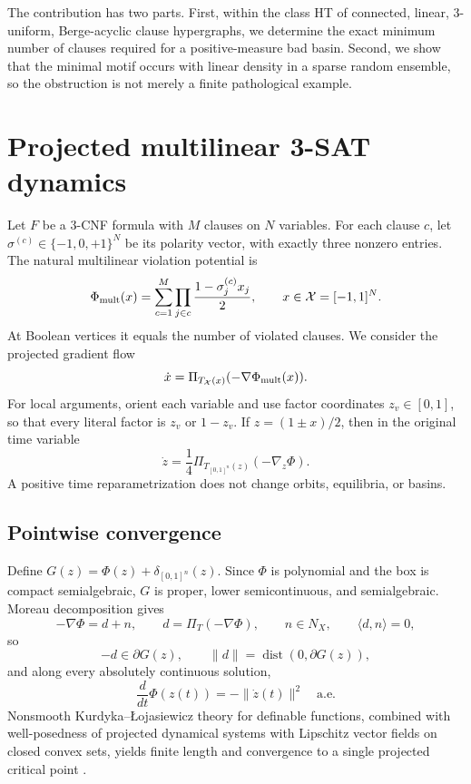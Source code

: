 \documentclass[11pt,a4paper]{article}
\newcommand{\X}{\mathcal X}
\begin{document}
The contribution has two parts. First, within the class HT of connected, linear, 3-uniform, Berge-acyclic clause hypergraphs, we determine the exact minimum number of clauses required for a positive-measure bad basin. Second, we show that the minimal motif occurs with linear density in a sparse random ensemble, so the obstruction is not merely a finite pathological example.

\section{Projected multilinear 3-SAT dynamics}
Let $F$ be a 3-CNF formula with $M$ clauses on $N$ variables. For each clause $c$, let $\sigma^{(c)}\in\{-1,0,+1\}^N$ be its polarity vector, with exactly three nonzero entries. The natural multilinear violation potential is
\begin{equation}
\Phi_{\rm mult}(x)=\sum_{c=1}^M\prod_{j\in c}\frac{1-\sigma_j^{(c)}x_j}{2},\qquad x\in\X=[-1,1]^N.
\end{equation}
At Boolean vertices it equals the number of violated clauses. We consider the projected gradient flow
\begin{equation}
\dot x=\Pi_{T_\X(x)}(-\nabla\Phi_{\rm mult}(x)).
\end{equation}
For local arguments, orient each variable and use factor coordinates $z_v\in[0,1]$, so that every literal factor is $z_v$ or $1-z_v$. If $z=(1\pm x)/2$, then in the original time variable
\begin{equation}
\dot z=\frac14\Pi_{T_{[0,1]^n}(z)}(-\nabla_z\Phi).
\end{equation}
A positive time reparametrization does not change orbits, equilibria, or basins.

\subsection{Pointwise convergence}
Define $G(z)=\Phi(z)+\delta_{[0,1]^n}(z)$. Since $\Phi$ is polynomial and the box is compact semialgebraic, $G$ is proper, lower semicontinuous, and semialgebraic. Moreau decomposition gives
\[
-\nabla\Phi=d+n,\qquad d=\Pi_T(-\nabla\Phi),\qquad n\in N_X,\qquad \langle d,n\rangle=0,
\]
so
\[
-d\in\partial G(z),\qquad \|d\|=\operatorname{dist}(0,\partial G(z)),
\]
and along every absolutely continuous solution,
\begin{equation}
\frac{d}{dt}\Phi(z(t))=-\|\dot z(t)\|^2\quad\text{a.e.}
\end{equation}
Nonsmooth Kurdyka--\L{}ojasiewicz theory for definable functions, combined with well-posedness of projected dynamical systems with Lipschitz vector fields on closed convex sets, yields finite length and convergence to a single projected critical point \cite{BDL,BDLS,Brogliato,Nagurney}.
\end{document}
